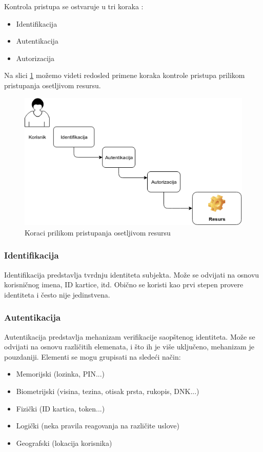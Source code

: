 \documentclass[a4paper]{article}
\begin{document}
Kontrola pristupa se ostvaruje u tri koraka \cite{Top10}:
\begin{itemize}
	\item Identifikacija
	\item Autentikacija
	\item Autorizacija
\end{itemize}
Na slici \ref{slika1} možemo videti redosled primene koraka kontrole pristupa prilikom pristupanja osetljivom resursu.

\begin{figure}[h]
\begin{center}
\includegraphics[scale=0.4]{koraci}
\caption{Koraci prilikom pristupanja osetljivom resursu}
\label{slika1}
\end{center}
\end{figure}

\subsubsection{Identifikacija}

Identifikacija predstavlja tvrdnju identiteta subjekta. Može se odvijati na osnovu korisničnog imena, ID kartice, itd. Obično se koristi  kao prvi stepen provere identiteta i često nije jedinstvena.

\subsubsection{Autentikacija}

Autentikacija predstavlja mehanizam verifikacije saopštenog identiteta. Može se odvijati na osnovu različitih elemenata, i što ih je više uključeno, mehanizam je pouzdaniji. Elementi se mogu grupisati na sledeći način: 
    \begin{itemize}
        \item Memorijski (lozinka, PIN...)
        \item Biometrijski (visina, tezina, otisak prsta, rukopis, DNK...)
        \item Fizički (ID kartica, token...)
        \item Logički (neka pravila reagovanja na različite uslove)
        \item Geografski (lokacija korisnika)
    \end{itemize}
\end{document}
